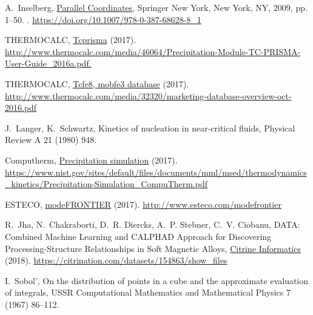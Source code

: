 \begin{thebibliography}{10}
A.~Inselberg, \href{https://doi.org/10.1007/978-0-387-68628-8_1}{Parallel Coordinates},
  Springer New York, New York, NY, 2009, pp. 1--50.
\newblock \href {http://dx.doi.org/10.1007/978-0-387-68628-8_1}
  {}.
\newline\urlprefix\url{https://doi.org/10.1007/978-0-387-68628-8_1}

THERMOCALC,
  \href{http://www.thermocalc.com/media/46064/Precipitation-Module-TC-PRISMA-User-Guide_2016a.pdf.}{Tcprisma}
  (2017).
\newline\urlprefix\url{http://www.thermocalc.com/media/46064/Precipitation-Module-TC-PRISMA-User-Guide_2016a.pdf.}

THERMOCALC,
  \href{http://www.thermocalc.com/media/32320/marketing-database-overview-oct-2016.pdf}{Tcfe8,
  mobfe3 database} (2017).
\newline\urlprefix\url{http://www.thermocalc.com/media/32320/marketing-database-overview-oct-2016.pdf}

J.~Langer, K.~Schwartz, Kinetics of nucleation in near-critical fluids,
  Physical Review A 21 (1980) 948.

Computherm,
  \href{https://www.nist.gov/sites/default/files/documents/mml/msed/thermodynamics_kinetics/Precipitation-Simulation_CompuTherm.pdf}{Precipitation
  simulation} (2017).
\newline\urlprefix\url{https://www.nist.gov/sites/default/files/documents/mml/msed/thermodynamics_kinetics/Precipitation-Simulation_CompuTherm.pdf}

ESTECO, \href{http://www.esteco.com/modefrontier}{modeFRONTIER} (2017).
\newline\urlprefix\url{http://www.esteco.com/modefrontier}

R.~Jha, N.~Chakraborti, D.~R. Diercks, A.~P. Stebner, C.~V. Ciobanu, DATA: Combined Machine Learning and CALPHAD Approach for Discovering Processing-Structure Relationships in Soft Magnetic Alloys, \href{https://citrination.com/datasets/154863/show_files}{Citrine Informatics } (2018).
\newline\urlprefix\url{https://citrination.com/datasets/154863/show_files}

I.~Sobol', On the distribution of points in a cube and the approximate
  evaluation of integrals, USSR Computational Mathematics and Mathematical
  Physics 7 (1967) 86--112.

\end{thebibliography}



